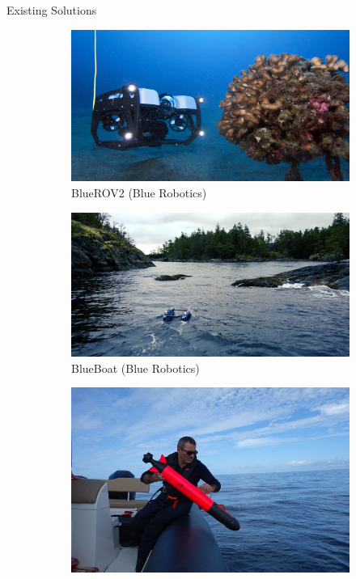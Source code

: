 \documentclass[9pt, xcolor={usenames, dvipsnames}]{beamer}
\begin{document}
        \begin{frame}{Existing Solutions}
            \begin{figure}
                \centering
                \begin{subfigure}[c]{0.4\textwidth}
                    \centering
                    \includegraphics[width=\textwidth]{imgs/bluerov2.jpg}
                    \caption{BlueROV2 (Blue Robotics)}
                \end{subfigure}
                \begin{subfigure}[c]{0.4\textwidth}
                    \centering
                    \includegraphics[width=\textwidth]{imgs/blueboat.jpg}
                    \caption{BlueBoat (Blue Robotics)}
                \end{subfigure}
                \begin{subfigure}[c]{0.4\textwidth}
                    \centering
                    \includegraphics[width=\textwidth]{imgs/yuco.jpg}

\end{subfigure}
\end{figure}
\end{frame}
\end{document}
